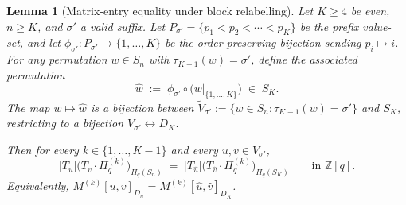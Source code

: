 \documentclass[11pt]{article}
\newtheorem{lemma}[theorem]{Lemma}
\theoremstyle{definition}
\begin{document}
\begin{lemma}[Matrix-entry equality under block relabelling]\label{lem:iso}
Let $K \geq 4$ be even, $n \geq K$, and $\sigma'$ a valid suffix.  Let $P_{\sigma'} = \{p_1 < p_2 < \cdots < p_K\}$ be the prefix value-set, and let $\phi_{\sigma'} : P_{\sigma'} \to \{1,\ldots,K\}$ be the order-preserving bijection sending $p_i \mapsto i$.  For any permutation $w \in S_n$ with $\tau_{K-1}(w) = \sigma'$, define the associated permutation
\[
\widehat{w} \;:=\; \phi_{\sigma'} \circ \bigl(w|_{\{1,\ldots,K\}}\bigr) \;\in\; S_K.
\]
The map $w \mapsto \widehat w$ is a bijection between $\widetilde{V}_{\sigma'} := \{w \in S_n : \tau_{K-1}(w) = \sigma'\}$ and $S_K$, restricting to a bijection $V_{\sigma'} \leftrightarrow D_K$.

Then for every $k \in \{1, \ldots, K-1\}$ and every $u, v \in V_{\sigma'}$,
\begin{equation}\label{eq:entry-match}
\bigl[T_u\bigr]\!\bigl(T_v \cdot \Pi^{(k)}_q\bigr)_{H_q(S_n)}
\;=\;
\bigl[T_{\widehat u}\bigr]\!\bigl(T_{\widehat v} \cdot \Pi^{(k)}_q\bigr)_{H_q(S_K)}
\qquad \text{in } \mathbb{Z}[q].
\end{equation}
Equivalently, $M^{(k)}[u, v]_{D_n} = M^{(k)}[\widehat u, \widehat v]_{D_K}$.
\end{lemma}
\end{document}
